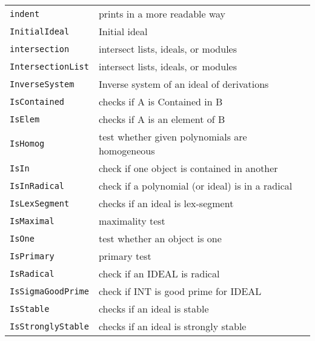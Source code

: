 \documentclass[a4paper]{mybook}
\begin{document}
\begin{center}
\begin{longtable}{ll}
{\verb~indent~} &
      prints in a more readable way\\
   
{\verb~InitialIdeal~} &
      Initial ideal\\
   
{\verb~intersection~} &
      intersect lists, ideals, or modules\\
   
{\verb~IntersectionList~} &
      intersect lists, ideals, or modules\\
   
{\verb~InverseSystem~} &
      Inverse system of an ideal of derivations\\
   
{\verb~IsContained~} &
      checks if A is Contained in B\\
   
{\verb~IsElem~} &
      checks if A is an element of B\\
   
{\verb~IsHomog~} &
      test whether given polynomials are homogeneous\\
   
{\verb~IsIn~} &
      check if one object is contained in another\\
   
{\verb~IsInRadical~} &
      check if a polynomial (or ideal) is in a radical\\
   
{\verb~IsLexSegment~} &
      checks if an ideal is lex-segment\\
   
{\verb~IsMaximal~} &
      maximality test\\
   
{\verb~IsOne~} &
      test whether an object is one\\
   
{\verb~IsPrimary~} &
      primary test\\
   
{\verb~IsRadical~} &
      check if an IDEAL is radical\\
   
{\verb~IsSigmaGoodPrime~} &
      check if INT is good prime for IDEAL \\
   
{\verb~IsStable~} &
      checks if an ideal is stable\\
   
{\verb~IsStronglyStable~} &
      checks if an ideal is strongly stable\\
   

\end{longtable}
\end{center}
\end{document}
